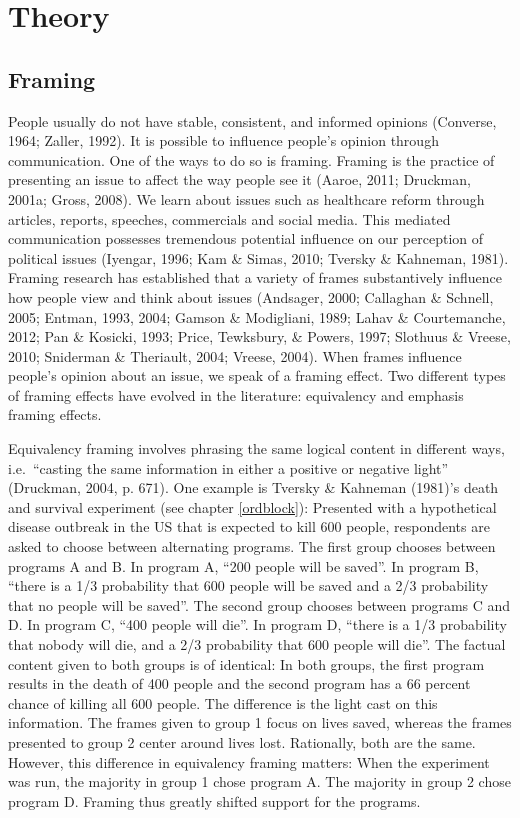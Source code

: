 \documentclass[12pt,econ]{sources/authesis}
\begin{document}
\hypertarget{framing-theory}{%
\section{Theory}\label{framing-theory}}

\hypertarget{framing-theory-framing}{%
\subsection{Framing}\label{framing-theory-framing}}

People usually do not have stable, consistent, and informed opinions (Converse, 1964; Zaller, 1992). It is possible to influence people's opinion through communication. One of the ways to do so is framing. Framing is the practice of presenting an issue to affect the way people see it (Aaroe, 2011; Druckman, 2001a; Gross, 2008). We learn about issues such as healthcare reform through articles, reports, speeches, commercials and social media. This mediated communication possesses tremendous potential influence on our perception of political issues (Iyengar, 1996; Kam \& Simas, 2010; Tversky \& Kahneman, 1981). Framing research has established that a variety of frames substantively influence how people view and think about issues (Andsager, 2000; Callaghan \& Schnell, 2005; Entman, 1993, 2004; Gamson \& Modigliani, 1989; Lahav \& Courtemanche, 2012; Pan \& Kosicki, 1993; Price, Tewksbury, \& Powers, 1997; Slothuus \& Vreese, 2010; Sniderman \& Theriault, 2004; Vreese, 2004). When frames influence people's opinion about an issue, we speak of a framing effect. Two different types of framing effects have evolved in the literature: equivalency and emphasis framing effects.

Equivalency framing involves phrasing the same logical content in different ways, i.e.~``casting the same information in either a positive or negative light'' (Druckman, 2004, p. 671). One example is Tversky \& Kahneman (1981)'s death and survival experiment (see chapter \ref{ordblock}): Presented with a hypothetical disease outbreak in the US that is expected to kill 600 people, respondents are asked to choose between alternating programs. The first group chooses between programs A and B. In program A, ``200 people will be saved''. In program B, ``there is a 1/3 probability that 600 people will be saved and a 2/3 probability that no people will be saved''. The second group chooses between programs C and D. In program C, ``400 people will die''. In program D, ``there is a 1/3 probability that nobody will die, and a 2/3 probability that 600 people will die''. The factual content given to both groups is of identical: In both groups, the first program results in the death of 400 people and the second program has a 66 percent chance of killing all 600 people. The difference is the light cast on this information. The frames given to group 1 focus on lives saved, whereas the frames presented to group 2 center around lives lost. Rationally, both are the same. However, this difference in equivalency framing matters: When the experiment was run, the majority in group 1 chose program A. The majority in group 2 chose program D. Framing thus greatly shifted support for the programs.
\end{document}
